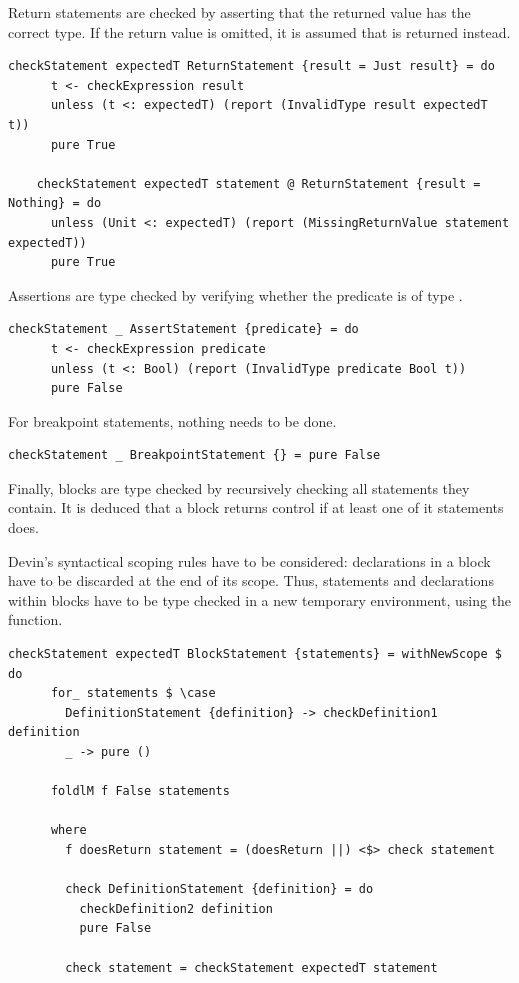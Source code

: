 \documentclass[UdineBachThesis,american,11pt]{PhdThesis}
\begin{document}
  Return statements are checked by asserting that the returned value has the
  correct type. If the return value is omitted, it is assumed that
  \lstinline@unit@ is returned instead.

  \begin{lstlisting}[gobble=4,basicstyle=\ttfamily\small]
    checkStatement expectedT ReturnStatement {result = Just result} = do
      t <- checkExpression result
      unless (t <: expectedT) (report (InvalidType result expectedT t))
      pure True

    checkStatement expectedT statement @ ReturnStatement {result = Nothing} = do
      unless (Unit <: expectedT) (report (MissingReturnValue statement expectedT))
      pure True
  \end{lstlisting}

  Assertions are type checked by verifying whether the predicate is of type
  \lstinline@Bool@.

  \begin{lstlisting}[gobble=4,basicstyle=\ttfamily\small]
    checkStatement _ AssertStatement {predicate} = do
      t <- checkExpression predicate
      unless (t <: Bool) (report (InvalidType predicate Bool t))
      pure False
  \end{lstlisting}

  For breakpoint statements, nothing needs to be done.

  \begin{lstlisting}[gobble=4,basicstyle=\ttfamily\small]
    checkStatement _ BreakpointStatement {} = pure False
  \end{lstlisting}

  Finally, blocks are type checked by recursively checking all statements they
  contain. It is deduced that a block returns control if at least one of it
  statements does.

  Devin's syntactical scoping rules have to be considered: declarations in a
  block have to be discarded at the end of its scope. Thus, statements and
  declarations within blocks have to be type checked in a new temporary
  environment, using the \lstinline@withNewScope@ function.

  \begin{lstlisting}[gobble=4,basicstyle=\ttfamily\small]
    checkStatement expectedT BlockStatement {statements} = withNewScope $ do
      for_ statements $ \case
        DefinitionStatement {definition} -> checkDefinition1 definition
        _ -> pure ()

      foldlM f False statements

      where
        f doesReturn statement = (doesReturn ||) <$> check statement

        check DefinitionStatement {definition} = do
          checkDefinition2 definition
          pure False

        check statement = checkStatement expectedT statement
  \end{lstlisting}
\end{document}
